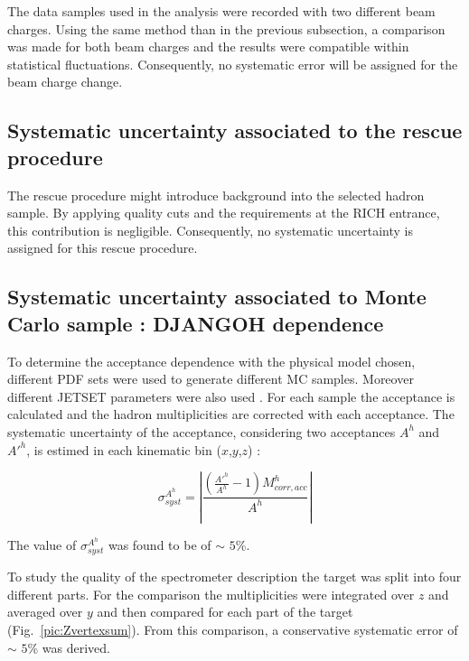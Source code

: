 The data samples used in the analysis were recorded with two different beam charges. Using the same method than in the previous subsection, a comparison was made for both beam charges and the results were compatible within statistical fluctuations. Consequently, no systematic error will be assigned for the beam charge change.


\subsection{Systematic uncertainty associated to the rescue procedure}


The rescue procedure might introduce background into the selected hadron sample. By applying quality cuts and the requirements at the RICH entrance, this contribution is negligible. Consequently, no systematic uncertainty is assigned for this rescue procedure.


\subsection{Systematic uncertainty associated to Monte Carlo sample : DJANGOH dependence}

To determine the acceptance dependence with the physical model chosen, different PDF sets were used to generate different MC samples. Moreover different JETSET parameters were also used \cite{PDFsys}. For each sample the acceptance is calculated and the hadron multiplicities are corrected with each acceptance. The systematic uncertainty of the acceptance, considering two acceptances $A^h$ and $A'^h$, is estimed in each kinematic bin ($x$,$y$,$z$) :

\begin{equation}
  \sigma^{A^h}_{syst} = \left| \frac{\left(\frac{A'^h}{A^h}-1 \right)M^h_{corr,acc}}{A^h} \right|
\end{equation}

The value of $\sigma^{A^h}_{syst}$ was found to be of $\sim$ $5$\%.

To study the quality of the spectrometer description the target was split into four different parts. For the comparison the multiplicities were integrated over $z$ and averaged over $y$ and then compared for each part of the target (Fig.~\ref{pic:Zvertexsum}). From this comparison, a conservative systematic error of $\sim$ $5$\% was derived.


